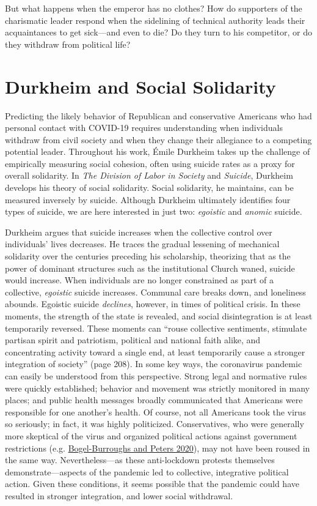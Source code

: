 \documentclass[
  12pt,
]{article}
\begin{document}
But what happens when the emperor has no clothes? How do supporters of the charismatic leader respond when the sidelining of technical authority leads their acquaintances to get sick---and even to die? Do they turn to his competitor, or do they withdraw from political life?

\hypertarget{durkheim-and-social-solidarity}{%
\section*{Durkheim and Social Solidarity}\label{durkheim-and-social-solidarity}}

Predicting the likely behavior of Republican and conservative Americans who had personal contact with COVID-19 requires understanding when individuals withdraw from civil society and when they change their allegiance to a competing potential leader. Throughout his work, Émile Durkheim takes up the challenge of empirically measuring social cohesion, often using suicide rates as a proxy for overall solidarity. In \emph{The Division of Labor in Society} and \emph{Suicide}, Durkheim develops his theory of social solidarity. Social solidarity, he maintains, can be measured inversely by suicide. Although Durkheim ultimately identifies four types of suicide, we are here interested in just two: \emph{egoistic} and \emph{anomic} suicide.

Durkheim argues that suicide increases when the collective control over individuals' lives decreases. He traces the gradual lessening of mechanical solidarity over the centuries preceding his scholarship, theorizing that as the power of dominant structures such as the institutional Church waned, suicide would increase. When individuals are no longer constrained as part of a collective, \emph{egoistic} suicide increases. Communal care breaks down, and loneliness abounds. Egoistic suicide \emph{declines}, however, in times of political crisis. In these moments, the strength of the state is revealed, and social disintegration is at least temporarily reversed. These moments can ``rouse collective sentiments, stimulate partisan spirit and patriotism, political and national faith alike, and concentrating activity toward a single end, at least temporarily cause a stronger integration of society'' (page 208). In some key ways, the coronavirus pandemic can easily be understood from this perspective. Strong legal and normative rules were quickly established; behavior and movement was strictly monitored in many places; and public health messages broadly communicated that Americans were responsible for one another's health. Of course, not all Americans took the virus so seriously; in fact, it was highly politicized. Conservatives, who were generally more skeptical of the virus and organized political actions against government restrictions (e.g. \protect\hyperlink{ref-Bogel-Burroughs2020}{Bogel-Burroughs and Peters 2020}), may not have been roused in the same way. Nevertheless---as these anti-lockdown protests themselves demonstrate---aspects of the pandemic led to collective, integrative political action. Given these conditions, it seems possible that the pandemic could have resulted in stronger integration, and lower social withdrawal.
\end{document}
